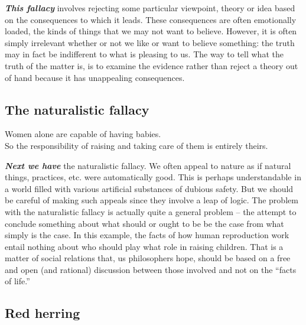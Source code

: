 \documentclass[12pt, openany]{book}
\begin{document}
\textbf{\emph{This fallacy}} involves rejecting some particular viewpoint, theory or idea based on the consequences to which it leads. These consequences are often emotionally loaded, the kinds of things that we may not want to believe. However, it is often simply irrelevant whether or not we like or want to believe something: the truth may in fact be indifferent to what is pleasing to us. The way to tell what the truth of the matter is, is to examine the evidence rather than reject a theory out of hand because it has unappealing consequences.

\hypertarget{the-naturalistic-fallacy}{%
\subsection*{The naturalistic fallacy}\label{the-naturalistic-fallacy}}


\begin{center}

\begin{argument}

Women alone are capable of having babies.\\

So the responsibility of raising and taking care of them is entirely theirs.

\end{argument}

\end{center}

\textbf{\emph{Next we have}} the naturalistic fallacy. We often appeal to nature as if natural things, practices, etc. were automatically good. This is perhaps understandable in a world filled with various artificial substances of dubious safety. But we should be careful of making such appeals since they involve a leap of logic. The problem with the naturalistic fallacy is actually quite a general problem -- the attempt to conclude something about what should or ought to be be the case from what simply is the case. In this example, the facts of how human reproduction work entail nothing about who should play what role in raising children. That is a matter of social relations that, us philosophers hope, should be based on a free and open (and rational) discussion between those involved and not on the ``facts of life.''

\hypertarget{red-herring}{%
\subsection*{Red herring}\label{red-herring}}
\end{document}
